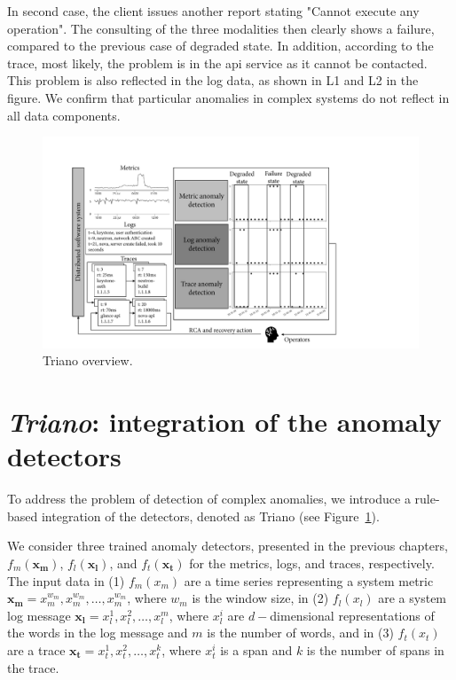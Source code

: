 In second case, the client issues another report stating "Cannot execute any operation". The consulting of the three modalities then clearly shows a failure, compared to the previous case of degraded state. In addition, according to the trace, most likely, the problem is in the api service as it cannot be contacted. This problem is also reflected in the log data, as shown in L1 and L2 in the figure. We confirm that particular anomalies in complex systems do not reflect in all data components. 

\begin{figure}[!b]
\centerline{\includegraphics[width=1.0\textwidth]{gfx/chap7/solution_overview.pdf}}
\caption{Triano overview.}
\label{fig:Triano}
\end{figure}

\section{\textit{Triano}: integration of the anomaly detectors}
To address the problem of detection of complex anomalies, we introduce a rule-based integration of the detectors, denoted as Triano (see Figure~\ref{fig:Triano}).

We consider three trained anomaly detectors, presented in the previous chapters, $f_m(\mathbf{x_m})$, $f_l(\mathbf{x_l})$, and $f_t(\mathbf{x_t})$ for the metrics, logs, and traces, respectively. The input data in (1) $f_m(x_m)$ are a time series representing a system metric $\mathbf{x_m}={x_m^{w_m}, x_m^{w_m}, \dots, x_m^{w_m}}$, where $w_m$ is the window size, in (2) $f_l(x_l)$ are a system log message $\mathbf{x_l}={x_l^1, x_l^2, \dots, x_l^m}$, where $x_l^i$ are $d-$dimensional representations of the words in the log message and $m$ is the number of words, and in (3) $f_t(x_t)$ are a trace $\mathbf{x_t} = {x_t^1, x_t^2, \dots, x_t^k}$, where $x_t^i$ is a span and $k$ is the number of spans in the  trace. 


